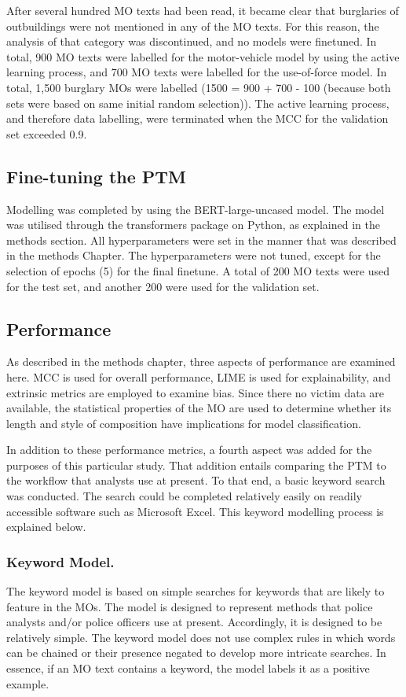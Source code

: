 After several hundred MO texts had been read, it became clear that burglaries of outbuildings were not mentioned in any of the MO texts. For this reason, the analysis of that category was discontinued, and no models were finetuned. In total, 900 MO texts were labelled for the motor-vehicle model by using the active learning process, and 700 MO texts were labelled for the use-of-force model. In total, 1,500 burglary MOs were labelled (1500 = 900 + 700 - 100 (because both sets were based on same initial random selection)). The active learning process, and therefore data labelling, were terminated when the MCC for the validation set exceeded 0.9.

\subsection{Fine-tuning the PTM} Modelling was completed by using the BERT-large-uncased model. The model was utilised through the transformers package on Python, as explained in the methods section. All hyperparameters were set in the manner that was described in the methods Chapter. The hyperparameters were not tuned, except for the selection of epochs (5) for the final finetune. A total of 200 MO texts were used for the test set, and another 200 were used for the validation set.

\subsection{Performance} As described in the methods chapter, three aspects of performance are examined here. MCC is used for overall performance, LIME is used for explainability,  and extrinsic metrics are employed to examine bias.  Since there no victim data are available, the statistical properties of the MO are used to determine whether its length and style of composition have implications for model classification.

In addition to these performance metrics, a fourth aspect was added for the purposes of this particular study. That addition entails comparing the PTM to the workflow that analysts use at present. To that end, a basic keyword search was conducted. The search could be completed relatively easily on readily accessible software such as Microsoft Excel. This keyword modelling process is explained below.


\subsubsection{Keyword Model.} The keyword model is based on simple searches for keywords that are likely to feature in the MOs. The model is designed to represent methods that police analysts and/or police officers use at present. Accordingly, it is designed to be relatively simple. The keyword model does not use complex rules in which words can be chained or their presence negated to develop more intricate searches. In essence, if an MO text contains a keyword, the model labels it as a positive example.

